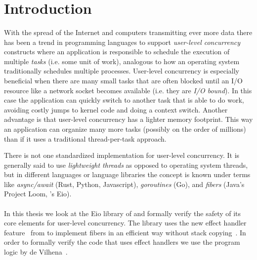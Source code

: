 \section{Introduction}
\label{sec:introduction}

\paragraph{}
With the spread of the Internet and computers transmitting ever more data there has been a trend in programming languages to support \emph{user-level concurrency} constructs
where an application is responsible to schedule the execution of multiple \emph{tasks} (i.e. some unit of work), analogous to how an operating system traditionally schedules multiple processes.
User-level concurrency is especially beneficial when there are many small tasks that are often blocked until an I/O resource like a network socket becomes available (i.e. they are \emph{I/O bound}).
In this case the application can quickly switch to another task that is able to do work, avoiding costly jumps to kernel code and doing a context switch.
Another advantage is that user-level concurrency has a lighter memory footprint.
This way an application can organize many more tasks (possibly on the order of millions) than if it uses a traditional thread-per-task approach.

There is not one standardized implementation for user-level concurrency.
It is generally said to use \emph{lightweight threads} as opposed to operating system threads, but in different languages or language libraries the concept is known under terms
like \emph{async/await} (Rust, Python, Javascript), \emph{goroutines} (Go), and \emph{fibers} (Java's Project Loom, \ocf{}'s Eio).

\paragraph{}

In this thesis we look at the Eio library of \ocf{} and formally verify the safety of its core elements for user-level concurrency.
The library uses the new effect handler feature~\cite{?} from \ocf{} to implement fibers in an efficient way without stack copying~\cite{?}.
In order to formally verify the code that uses effect handlers we use the \hazel{} program logic by de Vilhena~\cite{de2021separation,de2022proof}.


